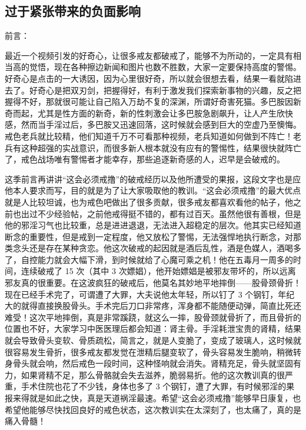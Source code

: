 \subsection{过于紧张带来的负面影响}

前言：

最近一个视频引发的好奇心，让很多戒友都破戒了，能够不为所动的，一定具有相当高的觉悟，现在各种擦边新闻和图片也数不胜数，大家一定要保持高度的警惕。好奇心是点击的一大诱因，因为心里很好奇，所以就会很想去看，结果一看就陷进去了。好奇心是把双刃剑，把握得好，有利于激发我们探索新事物的兴趣，反之把握得不好，那就很可能让自己陷入万劫不复的深渊，所谓好奇害死猫。多巴胺因新奇而起，尤其是性方面的新奇，新的性刺激会让多巴胺急剧飙升，让人产生欣快感，然而当手淫过后，多巴胺又迅速回落，这时候就会感到巨大的空虚乃至懊悔。戒色老兵就比较精，他们知道千万不可看那种视频，老兵知道如何做到不阵亡！老兵有这种超强的实战意识，而很多新人根本就没有应有的警惕性，结果很快就阵亡了，戒色战场唯有警惕者才能幸存，那些追逐新奇感的人，迟早是会破戒的。

这季前言再讲讲“这会必须戒撸”的破戒经历以及他所遭受的果报，这段文字也是应他本人要求而写，目的就是为了让大家吸取他的教训。“这会必须戒撸”的最大优点就是人比较坦诚，也为戒色吧做出了很多贡献，很多戒友都喜欢看他的帖子，他之前也出过不少经验帖，之前他戒得挺不错的，都有过百天。虽然他很有善根，但是他的邪淫习气也比较重，总是进进退退，无法进入超稳定的层次。他其实已经知道断念的重要性，但是戒到一定程度，他又放松了警惕，无法强悍地执行断念，对那类念头还是存在某种贪恋。他这次破戒的起因就是酒后乱性，酒是色媒人，酒喝多了，自控能力就会大幅下滑，到时候就给了心魔可乘之机！他在五毒月一周多的时间，连续破戒了 15 次（其中 3 次嫖娼），他开始嫖娼是被邪友带坏的，所以远离邪友真的很重要。在这波疯狂的破戒后，他莫名其妙地平地摔倒——股骨颈骨折！现在已经手术完了，可谓遭了大罪，大夫说他太年轻，所以钉了 3 个钢钉，年纪大的就得直接换股骨头。手术完后刀口非常疼，浑身都不能随便动弹，简直比死还难受！这次平地摔倒，真是非常蹊跷，就这么一摔，股骨颈就骨折了，而且骨折的位置也不好，大家学习中医医理后都会知道：肾主骨。手淫耗泄宝贵的肾精，结果就会导致骨头变软、骨质疏松，简言之，就是人变脆了，变成了玻璃人，这时候就很容易发生骨折，很多戒友都发觉在泄精后腿变软了，骨头容易发生脆响，稍微转身骨头就会响，然后戒色一段时间，这种怪响就会消失。肾精充足，骨头就坚固有力，如果肾精不足，那么骨骼就会失去滋养，脆弱易折。他的这次教训真的很严重，手术住院也花了不少钱，身体也多了 3 个钢钉，遭了大罪，有时候邪淫的果报来得就是如此之快，真是天道祸淫最速。希望“这会必须戒撸”能够早日康复，也希望他能够尽快找回良好的戒色状态，这次教训实在太深刻了，也太痛了，真的是痛入骨髓！

